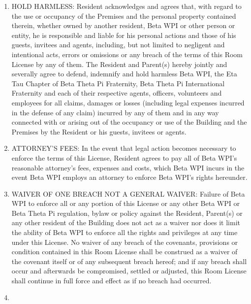 \documentclass[12pt]{article}
\begin{document}
\begin{enumerate}
\item\label{itm:holdharm}

HOLD HARMLESS\@: Resident acknowledges and agrees that, with regard to the use or occupancy of the Premises and the personal property contained therein, whether owned by another resident, Beta WPI or other person or entity, he is responsible and liable for his personal actions and those of his guests, invitees and agents, including, but not limited to negligent and intentional acts, errors or omissions or any breach of the terms of this Room License by any of them.
The Resident and Parent(s) hereby jointly and severally agree to defend, indemnify and hold harmless Beta WPI, the Eta Tau Chapter of Beta Theta Pi Fraternity, Beta Theta Pi International Fraternity and each of their respective agents, officers, volunteers and employees for all claims, damages or losses (including legal expenses incurred in the defense of any claim) incurred by any of them and in any way connected with or arising out of the occupancy or use of the Building and the Premises by the Resident or his guests, invitees or agents.

\item\label{itm:attorney}

ATTORNEY'S FEES\@: In the event that legal action becomes necessary to enforce the terms of this License, Resident agrees to pay all of Beta WPI’s reasonable attorney’s fees, expenses and costs, which Beta WPI incurs in the event Beta WPI employs an attorney to enforce Beta WPI’s rights hereunder.

\item\label{itm:waiver}

WAIVER OF ONE BREACH NOT A GENERAL WAIVER\@: Failure of Beta WPI to enforce all or any portion of this License or any other Beta WPI or Beta Theta Pi regulation, bylaw or policy against the Resident, Parent(s) or any other resident of the Building does not act as a waiver nor does it limit the ability of Beta WPI to enforce all the rights and privileges at any time under this License.
No waiver of any breach of the covenants, provisions or condition contained in this Room License shall be construed as a waiver of the covenant itself or of any subsequent breach hereof; and if any breach shall occur and afterwards be compromised, settled or adjusted, this Room License shall continue in full force and effect as if no breach had occurred.

\item\label{itm:sublicense}


\end{enumerate}
\end{document}
